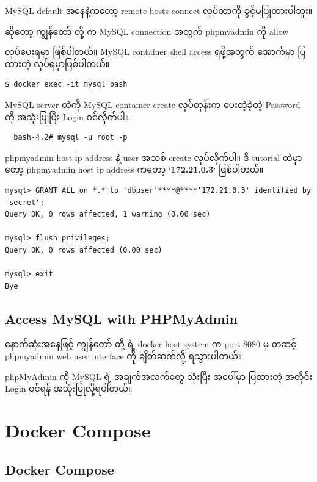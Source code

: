 \documentclass{article}
\begin{document}
MySQL default အနေနဲ့ကတော့ remote hosts connect လုပ်တာကို
ခွင့်မပြုထားပါဘူး။

ဆိုတော့ ကျွန်တော် တို့ က MySQL connection အတွက် phpmyadmin ကို allow

လုပ်ပေးရမှာ ဖြစ်ပါတယ်။ MySQL container shell access ရဖို့အတွက် အောက်မှာ
ပြထားတဲ့ လုပ်ရမှာဖြစ်ပါတယ်။

\begin{verbatim}
$ docker exec -it mysql bash
\end{verbatim}

MySQL server ထဲကို MySQL container create လုပ်တုန်းက ပေးထဲ့ခဲ့တဲ့
Password ကို အသုံးပြုပြီး Login ဝင်လိုက်ပါ။

\begin{verbatim}
  bash-4.2# mysql -u root -p
\end{verbatim}

phpmyadmin host ip address နဲ့ user အသစ် create လုပ်လိုက်ပါ။ ဒီ tutorial
ထဲမှာတော့ phpmyadmin host ip address ကတော့ `\textbf{172.21.0.3}`
ဖြစ်ပါတယ်။

\begin{verbatim}
mysql> GRANT ALL on *.* to 'dbuser'****@****'172.21.0.3' identified by 'secret';
Query OK, 0 rows affected, 1 warning (0.00 sec)

mysql> flush privileges;
Query OK, 0 rows affected (0.00 sec)

mysql> exit
Bye
\end{verbatim}

\subsection{Access MySQL with
PHPMyAdmin}\label{access-mysql-with-phpmyadmin}

နောက်ဆုံးအနေဖြင့် ကျွန်တော် တို့ ရဲ့ docker host system က port 8080 မှ
တဆင့် phpmyadmin web user interface ကို ချိတ်ဆက်လို့ ရသွားပါတယ်။

phpMyAdmin ကို MySQL ရဲ့ အချက်အလက်တွေ သုံးပြီး အပေါ်မှာ ပြထားတဲ့ အတိုင်း
Login ဝင်ရန် အသုံးပြုလို့ရပါတယ်။

\pagebreak

\section{Docker Compose}\label{docker-compose}

\subsection{Docker Compose}\label{docker-compose-1}
\end{document}
